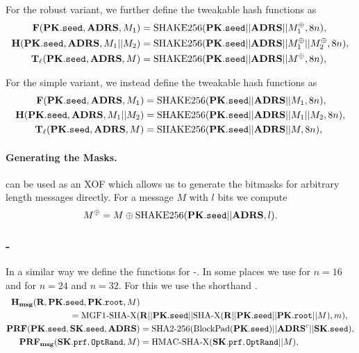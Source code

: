     For the robust variant, we further define the tweakable hash functions as
    \begin{equation}
      \begin{aligned}
         \mathbf{F}(\mathbf{PK}.\texttt{seed}, \textbf{ADRS}, M_1) &= \text{SHAKE256}(\mathbf{PK}.\texttt{seed} || \textbf{ADRS} || M_1^{\oplus}, 8n),\\
         \mathbf{H}(\mathbf{PK}.\texttt{seed}, \textbf{ADRS}, M_1 || M_2) &= \text{SHAKE256}(\mathbf{PK}.\texttt{seed} || \textbf{ADRS} || M_1^{\oplus} || M_2^{\oplus}, 8n),\\
         \mathbf{T}_\ell(\mathbf{PK}.\texttt{seed}, \textbf{ADRS}, M) &= \text{SHAKE256}(\mathbf{PK}.\texttt{seed} || \textbf{ADRS} || M^{\oplus}, 8n),\\
      \end{aligned}
    \end{equation}

    For the simple variant, we instead define the tweakable hash functions as
    \begin{equation}
      \begin{aligned}
         \mathbf{F}(\mathbf{PK}.\texttt{seed}, \textbf{ADRS}, M_1) &= \text{SHAKE256}(\mathbf{PK}.\texttt{seed} || \textbf{ADRS} || M_1, 8n),\\
         \mathbf{H}(\mathbf{PK}.\texttt{seed}, \textbf{ADRS}, M_1 || M_2) &= \text{SHAKE256}(\mathbf{PK}.\texttt{seed} || \textbf{ADRS} || M_1 || M_2, 8n),\\
         \mathbf{T}_\ell(\mathbf{PK}.\texttt{seed}, \textbf{ADRS}, M) &= \text{SHAKE256}(\mathbf{PK}.\texttt{seed} || \textbf{ADRS} || M, 8n),\\
      \end{aligned}
    \end{equation}

   \paragraph{Generating the Masks.} \shathree can be used as an XOF which
   allows us to generate the bitmasks for arbitrary length messages directly.
   For a message $M$ with $l$ bits we compute
   \begin{equation*}
      M^{\oplus} = M \oplus \text{SHAKE256}(\mathbf{PK}.\texttt{seed} || \textbf{ADRS}, l).
   \end{equation*}

\subsubsection{\spx-\shatwo}
   In a similar way we define the functions for \spx-\shatwo. In some places we use \shatwofs for $n = 16$ and \shatwofivetwelve for $n=24$ and $n=32$. For this we use the shorthand \shaX.
   \begin{equation}
   \begin{aligned}
      \mathbf{H_{msg}}(\mathbf{R},\mathbf{PK}.\texttt{seed}, \mathbf{PK}.\texttt{root}, M) &\\
              = \text{MGF1-}\text{SHA-X}(&\mathbf{R} || \mathbf{PK}.\texttt{seed} || \text{SHA-X}(\mathbf{R} || \mathbf{PK}.\texttt{seed} || \mathbf{PK}.\texttt{root} || M), m),\\
      \mathbf{PRF}(\mathbf{PK}.\texttt{seed}, \mathbf{SK}.\texttt{seed}, \textbf{ADRS}) &= \text{SHA2-256}(\text{BlockPad}(\mathbf{PK}.\texttt{seed})|| \textbf{ADRS}^{c} || \mathbf{SK}.\texttt{seed}),\\
      \mathbf{PRF_{msg}}(\mathbf{SK}.\texttt{prf}, \texttt{OptRand}, M) &= \text{HMAC-}\text{SHA-X}(\mathbf{SK}.\texttt{prf}, \texttt{OptRand} || M),\\
   \end{aligned}
   \end{equation}

